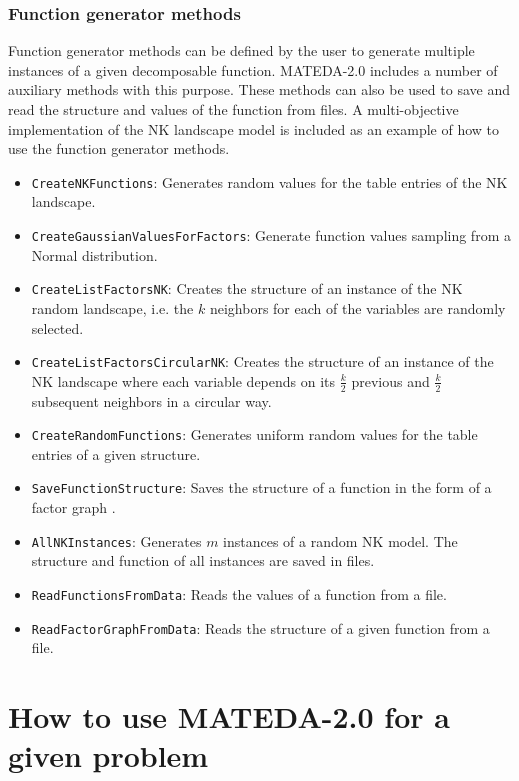 \documentclass[a4paper]{article}
\begin{document}
\subsubsection{Function generator methods}

 Function generator methods can be defined by the user to generate
 multiple instances of a given decomposable function. MATEDA-2.0
 includes a number of auxiliary methods with this purpose. These
 methods can also be used to save and read the structure and values
 of the function from files. A multi-objective implementation of the NK landscape model is
 included as an example of how to use the function generator
 methods.


 \begin{itemize}
 \item \texttt{CreateNKFunctions}:   Generates random values for the table entries of the NK
 landscape.
 \item \texttt{CreateGaussianValuesForFactors}: Generate function values sampling from a Normal
 distribution.
 \item \texttt{CreateListFactorsNK}:   Creates the structure of an instance of the NK random
 landscape, i.e. the $k$ neighbors for each of the variables are  randomly
 selected.
 \item \texttt{CreateListFactorsCircularNK}:   Creates the structure of an instance of the NK landscape
                                where each variable depends on its
                                $\frac{k}{2}$  previous and $\frac{k}{2}$ subsequent neighbors in a
                                circular way.
 \item \texttt{CreateRandomFunctions}: Generates uniform random values for the table entries of a given
 structure.
 \item \texttt{SaveFunctionStructure}:   Saves the structure of a function in the form of a factor
 graph \cite{Kschischang_and_Frey:1998}.
 \item   \texttt{AllNKInstances}:   Generates $m$ instances of a random NK model.  The structure and function of all instances are saved  in
   files.
  \item \texttt{ReadFunctionsFromData}:    Reads the  values  of a  function
  from a file.
\item \texttt{ReadFactorGraphFromData}:    Reads the  structure  of a
given function from a file.
\end{itemize}


\section{How to use MATEDA-2.0 for a given problem}
\end{document}
